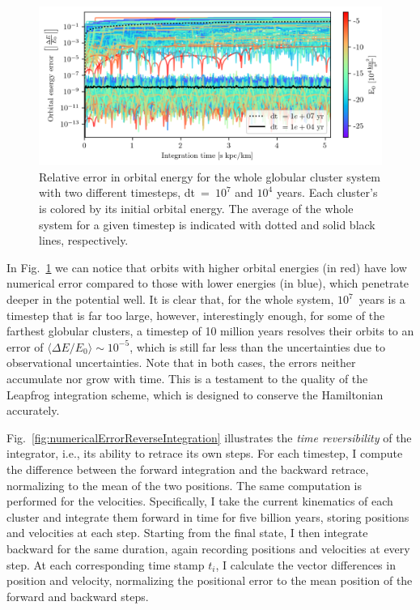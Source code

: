         \begin{figure}
            \centering
            \includegraphics[width=\linewidth]{images/numericalErrorLeapfrogVanilla.png}
            \caption[Relative orbital energy error for the globular cluster system]{Relative error in orbital energy for the whole globular cluster system with two different timesteps, dt~=~$10^{7}$ and $10^{4}$ years. Each cluster's is colored by its initial orbital energy. The average of the whole system for a given timestep is indicated with dotted and solid black lines, respectively.}
            \label{fig:numericalErrorLeapfrogVanilla}
        \end{figure}
        In Fig.~\ref{fig:numericalErrorLeapfrogVanilla} we can notice that orbits with higher orbital energies (in red) have low numerical error compared to those with lower energies (in blue),  which penetrate deeper in the potential well. It is clear that, for the whole system, $10^7$~years is a timestep that is far too large, however, interestingly enough, for some of the farthest globular clusters, a timestep of 10 million years resolves their orbits to an error of $\langle \Delta E / E_0 \rangle \sim 10^{-5}$, which is still far less than the uncertainties due to observational uncertainties. Note that in both cases, the errors neither accumulate nor grow with time. This is a testament to the quality of the Leapfrog integration scheme, which is designed to conserve the Hamiltonian accurately.

        Fig.~\ref{fig:numericalErrorReverseIntegration} illustrates the \textit{time reversibility} of the integrator, i.e., its ability to retrace its own steps. For each timestep, I compute the difference between the forward integration and the backward retrace, normalizing to the mean of the two positions. The same computation is performed for the velocities. Specifically, I take the current kinematics of each cluster and integrate them forward in time for five billion years, storing positions and velocities at each step. Starting from the final state, I then integrate backward for the same duration, again recording positions and velocities at every step. At each corresponding time stamp $t_i$, I calculate the vector differences in position and velocity, normalizing the positional error to the mean position of the forward and backward steps.
        
